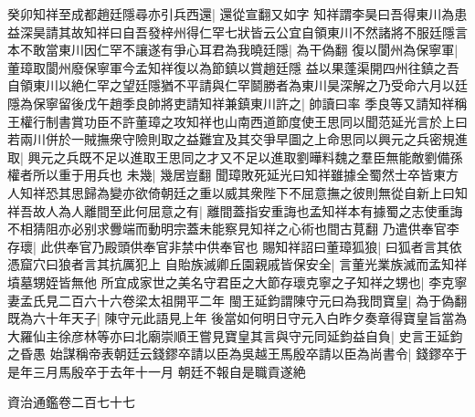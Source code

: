 癸卯知祥至成都趙廷隱尋亦引兵西還|{
	還從宣翻又如字}
知祥謂李昊曰吾得東川為患益深昊請其故知祥曰自吾發梓州得仁罕七狀皆云公宜自領東川不然諸將不服廷隱言本不敢當東川因仁罕不讓遂有爭心耳君為我曉廷隱|{
	為干偽翻}
復以閬州為保寧軍|{
	董璋取閬州廢保寧軍今孟知祥復以為節鎮以賞趙廷隱}
益以果蓬渠開四州往鎮之吾自領東川以絶仁罕之望廷隱猶不平請與仁罕鬬勝者為東川昊深解之乃受命六月以廷隱為保寧留後戊午趙季良帥將吏請知祥兼鎮東川許之|{
	帥讀曰率}
季良等又請知祥稱王權行制書賞功臣不許董璋之攻知祥也山南西道節度使王思同以聞范延光言於上曰若兩川併於一賊撫衆守險則取之益難宜及其交爭早圖之上命思同以興元之兵密規進取|{
	興元之兵既不足以進取王思同之才又不足以進取劉曄料魏之羣臣無能敵劉備孫權者所以重于用兵也}
未幾|{
	幾居豈翻}
聞璋敗死延光曰知祥雖據全蜀然士卒皆東方人知祥恐其思歸為變亦欲倚朝廷之重以威其衆陛下不屈意撫之彼則無從自新上曰知祥吾故人為人離間至此何屈意之有|{
	離間蓋指安重誨也孟知祥本有據蜀之志使重誨不相猜阻亦必别求釁端而動明宗蓋未能察見知祥之心術也間古莧翻}
乃遣供奉官李存瓌|{
	此供奉官乃殿頭供奉官非禁中供奉官也}
賜知祥詔曰董璋狐狼|{
	曰狐者言其依憑窟穴曰狼者言其抗厲犯上}
自貽族滅卿丘園親戚皆保安全|{
	言董光業族滅而孟知祥墳墓甥姪皆無他}
所宜成家世之美名守君臣之大節存瓌克寧之子知祥之甥也|{
	李克寧妻孟氏見二百六十六卷梁太祖開平二年}
閩王延鈞謂陳守元曰為我問寶皇|{
	為于偽翻}
既為六十年天子|{
	陳守元此語見上年}
後當如何明日守元入白昨夕奏章得寶皇旨當為大羅仙主徐彦林等亦曰北廟崇順王嘗見寶皇其言與守元同延鈞益自負|{
	史言王延鈞之昏愚}
始謀稱帝表朝廷云錢鏐卒請以臣為吳越王馬殷卒請以臣為尚書令|{
	錢鏐卒于是年三月馬殷卒于去年十一月}
朝廷不報自是職貢遂絶

資治通鑑卷二百七十七
